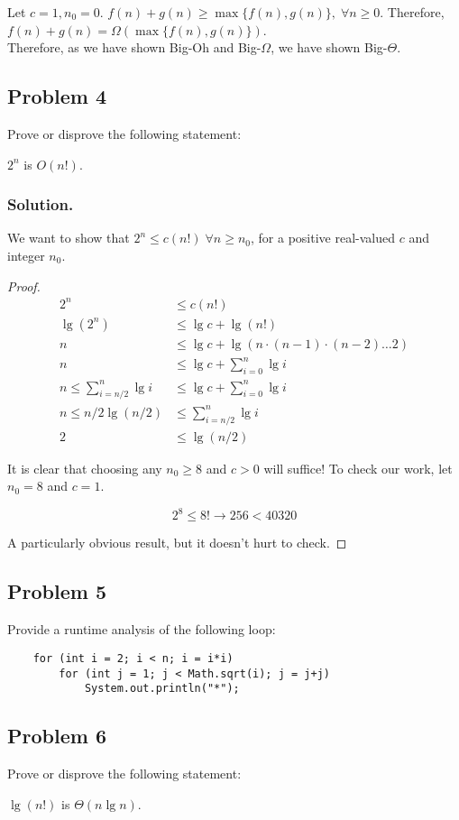 Let $c = 1, n_0 = 0$. $f(n) + g(n) \geq \max\{f(n), g(n)\},\;\forall n \geq 0$. Therefore, $f(n) + g(n) = \Omega(\max\{f(n), g(n)\})$.\\

Therefore, as we have shown Big-Oh and Big-$\Omega$, we have shown Big-$\Theta$.

\subsection*{Problem 4}
Prove or disprove the following statement:
\begin{center}
    $2^n$ is $O(n!)$.
\end{center}

\subsubsection*{Solution.}

We want to show that $2^n \leq c(n!)\; \forall n \geq n_0$, for a positive real-valued $c$ and integer $n_0$.\\

\begin{proof}
    \begin{align*}
        2^n &\leq c(n!)\\
        \lg(2^n) &\leq \lg c + \lg(n!)\\
        n &\leq \lg c + \lg(n\cdot(n-1)\cdot(n-2)\dots2)\\
        n &\leq \lg c + \sum_{i=0}^n \lg i\\
        n \leq \sum_{i=n/2}^n \lg i &\leq \lg c + \sum_{i=0}^n \lg i\\
        n \leq n/2 \lg(n/2) &\leq \sum_{i=n/2}^n \lg i\\
        2 &\leq \lg(n/2)
    \end{align*}

    It is clear that choosing any $n_0 \geq 8$ and $c > 0$ will suffice! To check our work, let $n_0 = 8$ and $c = 1$.

    $$2^8 \leq 8! \rightarrow 256 < 40320$$

    A particularly obvious result, but it doesn't hurt to check.

\end{proof}

\subsection*{Problem 5}
Provide a runtime analysis of the following loop:

\begin{verbatim}
    for (int i = 2; i < n; i = i*i)
        for (int j = 1; j < Math.sqrt(i); j = j+j)
            System.out.println("*");
\end{verbatim}

\subsection*{Problem 6}
Prove or disprove the following statement:

\begin{center}
    $\lg(n!)$ is $\Theta(n\lg{n})$.
\end{center}

